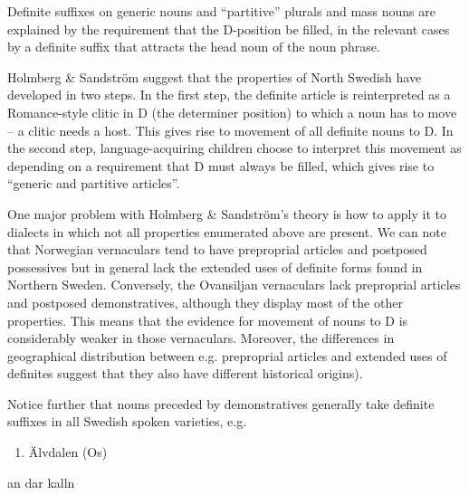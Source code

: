 Definite suffixes on generic nouns and “partitive” plurals and mass nouns are explained by the requirement that the D-position be filled, in the relevant cases by a definite suffix that attracts the head noun of the noun phrase. 

Holmberg \& Sandström suggest that the properties of North Swedish have developed in two steps. In the first step, the definite article is reinterpreted as a Romance-style clitic in D (the determiner position) to which a noun has to move – a clitic needs a host. This gives rise to movement of all definite nouns to D. In the second step, language-acquiring children choose to interpret this movement as depending on a requirement that D must always be filled, which gives rise to “generic and partitive articles”. 

One major problem with Holmberg \& Sandström’s theory is how to apply it to dialects in which not all properties enumerated above are present. We can note that Norwegian vernaculars tend to have preproprial articles and postposed possessives but in general lack the extended uses of definite forms found in Northern Sweden. Conversely, the Ovansiljan vernaculars lack preproprial articles and postposed demonstratives, although they display most of the other properties. This means that the evidence for movement of nouns to D is considerably weaker in those vernaculars. Moreover, the differences in geographical distribution between e.g. preproprial articles and extended uses of definites suggest that they also have different historical origins). 

Notice further that nouns preceded by demonstratives generally take definite suffixes in all Swedish spoken varieties, e.g.

\begin{enumerate} %
\item 
Älvdalen (Os)

\end{enumerate} %
\ea\label{}
\gll an  dar  kalln\\


